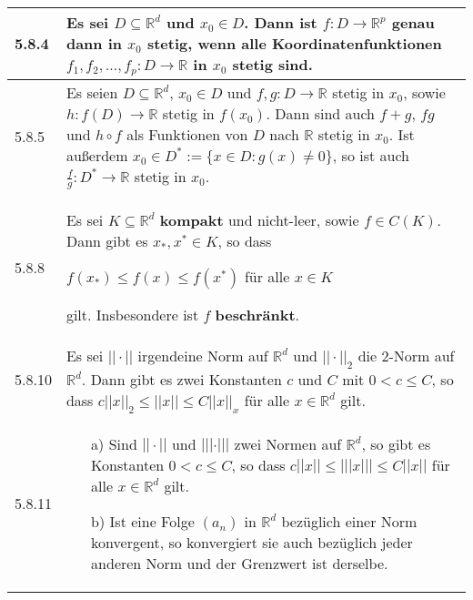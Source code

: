     \begin{longtable}{p{1cm} p{16cm}}
        \toprule

        5.8.4 & Es sei $D \subseteq \mathbb{R}^d$ und $x_0 \in D$. Dann ist $f: D \rightarrow \mathbb{R}^p$ genau dann in $x_0$
                \textbf{stetig}, wenn alle Koordinatenfunktionen $f_1, f_2, \dots, f_p : D \rightarrow \mathbb{R}$ in $x_0$ stetig sind. \\
        \midrule
        5.8.5 &  Es seien $D \subseteq \mathbb{R}^d$, $x_0 \in D$ und $f,g : D \rightarrow \mathbb{R}$ stetig in $x_0$, sowie
                $h : f(D) \rightarrow \mathbb{R}$ stetig in $f(x_0)$. Dann sind auch $f+g$, $fg$ und $h \circ f$ als Funktionen
                von $D$ nach $\mathbb{R}$ stetig in $x_0$. \hfill \break
                Ist au\ss erdem $x_0 \in D^* := \{x \in D: g(x) \neq 0\}$, so ist auch $\frac{f}{g}:D^* \rightarrow \mathbb{R}$ stetig in $x_0$. \\
        \midrule
        5.8.8 & Es sei $K \subseteq \mathbb{R}^d$ \textbf{kompakt} und nicht-leer, sowie $f \in C(K)$. Dann gibt es $x_*, x^* \in K$, so dass \hfill \break
                \centerline{$f(x_*) \leq f(x) \leq f(x^*)$ für alle $x \in K$}
                gilt. Insbesondere ist $f$ \textbf{beschränkt}. \\
        \midrule
        5.8.10& Es sei $||\cdot||$ irgendeine Norm auf $\mathbb{R}^d$ und $||\cdot||_2$ die 2-Norm auf $\mathbb{R}^d$. Dann gibt es zwei Konstanten
                $c$ und $C$ mit $0 < c \leq C$, so dass $c||x||_2  \leq ||x|| \leq C ||x||_x$ für alle $x \in \mathbb{R}^d$ gilt. \\
        \midrule
        5.8.11& \begin{itemize}[topsep=-0.5cm]
                    \item[a)] Sind $||\cdot||$ und $|||\cdot|||$ zwei Normen auf $\mathbb{R}^d$, so gibt es Konstanten $0 < c \leq C$, so dass
                                $c||x|| \leq |||x||| \leq C||x||$ für alle $x \in \mathbb{R}^d$ gilt.
                    \item[b)] Ist eine Folge $(a_n)$ in $\mathbb{R}^d$ bezüglich einer Norm konvergent, so konvergiert sie auch bezüglich  
                                jeder anderen Norm und der Grenzwert ist derselbe. 
                \end{itemize} \vspace{-0cm} \\
        \bottomrule
    \end{longtable}
    

